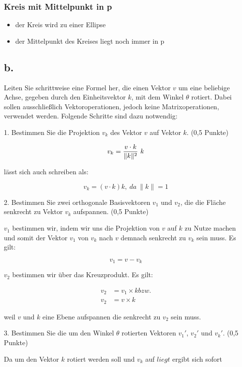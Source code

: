 \documentclass[12pt]{scrreprt}
\begin{document}
\subsubsection*{Kreis mit Mittelpunkt in p}

\begin{itemize}
  \item der Kreis wird zu einer Ellipse
  \item der Mittelpunkt des Kreises liegt noch immer in p
\end{itemize}


\subsection*{b.}

Leiten Sie schrittweise eine Formel her, die einen Vektor $v$ um eine beliebige Achse, gegeben durch den
Einheitsvektor $k$, mit dem Winkel $\theta$ rotiert. Dabei sollen ausschließlich Vektoroperationen, jedoch keine
Matrixoperationen, verwendet werden. Folgende Schritte sind dazu notwendig:

1. Bestimmen Sie die Projektion $v_k$ des Vektor $v$ auf Vektor $k$. (0,5 Punkte)

\[
	v_k = {v \cdot k \over \|k\|^2}~k
\]

lässt sich auch schreiben als:

\[
	v_k = (v \cdot k)k, ~da ~\| k \| = 1
\]

2. Bestimmen Sie zwei orthogonale Basisvektoren $v_1$ und $v_2$, die die Fläche senkrecht zu Vektor $v_k$
aufspannen. (0,5 Punkte)

$v_1$ bestimmen wir, indem wir uns die Projektion von $v$ auf $k$ zu Nutze machen und somit der Vektor $v_1$ von $v_k$ nach $v$ demnach senkrecht zu $v_k$ sein muss. Es gilt:

\[
v_1 = v - v_k
\]

$v_2$ bestimmen wir über das Kreuzprodukt. Es gilt:

\begin{align*}
	v_2 &= v_1 \times k bzw.\\
	v_2 &= v \times k
\end{align*}

weil $v$ und $k$ eine Ebene aufspannen die senkrecht zu $v_2$ sein muss.

3. Bestimmen Sie die um den Winkel $\theta$ rotierten Vektoren $v_1'$, $v_2'$ und $v_k'$. (0,5 Punkte)

Da um den Vektor $k$ rotiert werden soll und $v_k$ auf $liegt$ ergibt sich sofort
\end{document}
